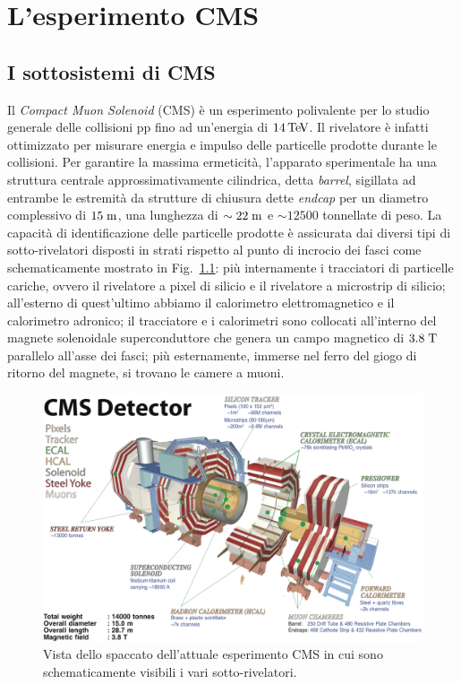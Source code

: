 \chapter{L'esperimento CMS}

\section{I sottosistemi di CMS}

Il {\em Compact Muon Solenoid} (CMS)\cite{Chatrchyan:2008aa} \`e un esperimento polivalente per lo studio generale delle collisioni pp fino ad un’energia di $14{\rm \, Te\kern-0.125em V}$. Il rivelatore \`e infatti ottimizzato per misurare energia e impulso delle particelle prodotte durante le collisioni. Per garantire la massima ermeticit\`a, l’apparato sperimentale ha una struttura centrale approssimativamente cilindrica, detta {\em barrel}, sigillata ad entrambe le estremit\`a da strutture di chiusura dette {\em endcap} per un diametro complessivo di $15\rm \; m$, una lunghezza di $\sim22\rm \; m$ e $\sim 12500$ tonnellate di peso. La capacit\`a di identificazione delle particelle prodotte \`e assicurata dai diversi tipi di sotto-rivelatori disposti in strati rispetto al punto di incrocio dei fasci come schematicamente mostrato in Fig.~\ref{fig:spaccatoCMS}: pi\`u internamente i tracciatori di particelle cariche, ovvero il rivelatore a pixel di silicio e il rivelatore a microstrip di silicio; all'esterno di quest'ultimo abbiamo il calorimetro elettromagnetico e il calorimetro adronico; il tracciatore e i calorimetri sono collocati all’interno del magnete solenoidale superconduttore che genera un campo magnetico di $3.8\rm \; T$ parallelo all'asse dei fasci; pi\`u esternamente, immerse nel ferro del giogo di ritorno del magnete, si trovano le camere a muoni.
\begin{figure}
\centering
\includegraphics[width=\textwidth]{Immagini/cms_3d.png}
\caption{Vista dello spaccato dell'attuale esperimento CMS in cui sono schematicamente visibili i vari sotto-rivelatori.}
\label{fig:spaccatoCMS}
\end{figure}

